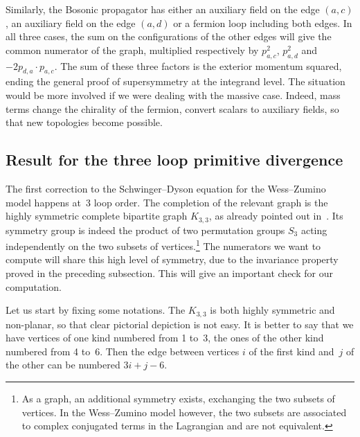 \documentclass[pdftex]{sigma}
\numberwithin{equation}{section}
\begin{document}
Similarly, the Bosonic propagator has either an auxiliary field on the edge $(a,c)$, an auxiliary field on
the edge $(a,d)$ or a fermion loop including both edges. In all three cases, the sum on the configurations
of the other edges will give the common numerator of the graph, multiplied respectively by $p_{a,c}^2$,
$p_{a,d}^2$ and~$-2p_{d,a}\cdot p_{a,c}$. The sum of these three factors is the exterior momentum squared,
ending the general proof of supersymmetry at the integrand level. The situation would be more involved if we
were dealing with the massive case. Indeed, mass terms change the chirality of the fermion, convert scalars to auxiliary
fields, so that new topologies become possible.

\subsection{Result for the three loop primitive divergence} \label{K33}

The first correction to the Schwinger--Dyson equation for the Wess--Zumino model happens at~3 loop order. The
completion of the relevant graph is the highly symmetric complete bipartite graph $K_{3,3}$, as already pointed
out in~\cite{BeSc12}. Its symmetry
group is indeed the product of two permutation groups $S_3$ acting independently on the two subsets of
vertices.\footnote{As a graph, an additional symmetry exists, exchanging the two subsets of vertices. In the Wess--Zumino model however, the two
subsets are associated to complex conjugated terms in the Lagrangian and are not equivalent.} The numerators we want to compute will share
this high level of symmetry, due to the invariance property proved in the preceding subsection. This will give an important check for our computation.

Let us start by fixing some notations. The $K_{3,3}$ is both highly symmetric and non-planar, so that clear
pictorial depiction is not easy. It is better to say that we have vertices of one kind numbered from 1 to~3,
the ones of the other kind numbered from 4 to~6. Then the edge between vertices $i$ of the first kind and~$j$
of the other can be numbered $3 i + j - 6$.
\end{document}
